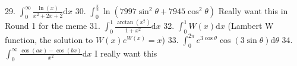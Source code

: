 \documentclass{article}
\newcommand{\dd}{\mathrm{d}}
\begin{document}
\begin{flushleft}
29. $\int_0^{\infty} \frac{\ln(x)}{x^2+2x+2} \dd x$ \newline  \newline \newline 
30. $\int_0^{\frac{\pi}{2}} \ln(7997\sin^2{\theta}+7945\cos^2{\theta})$ Really want this in Round 1 for the meme \newline  \newline \newline  %
31. $\int_0^1 \frac{\arctan(x^2)}{1+x^2} \dd x$ \newline  \newline \newline 
32. $\int_0^1 W(x) \dd x$ (Lambert W function, the solution to $W(x)e^{W(x)}=x$) \newline  \newline \newline 
33. $\int_0^{2\pi} e^{3\cos{\theta}}\cos(3\sin{\theta}) \dd \theta $ \newline  \newline \newline 
34. $\int_0^{\infty} \frac{\cos(ax)-\cos(bx)}{x^2} \dd x$ I really want this \newline  \newline \newline 


\end{flushleft}
\end{document}
